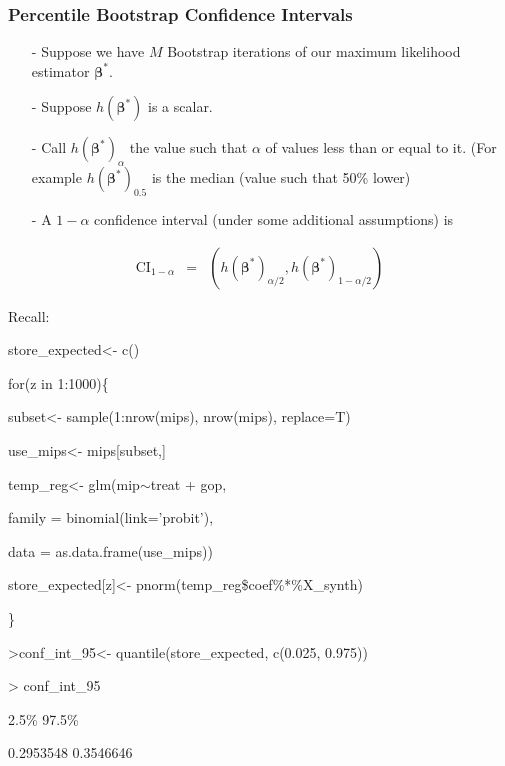 \documentclass{beamer}
\begin{document}
\begin{frame}
\frametitle{Percentile Bootstrap Confidence Intervals}

\begin{itemize}
\item[-] Suppose we have $M$ Bootstrap iterations of our maximum likelihood estimator $\boldsymbol{\beta}^{*}$. 
\item[-] Suppose $h(\boldsymbol{\beta}^{*})$ is a scalar.    
\item[-] Call $h(\boldsymbol{\beta}^{*})_{\alpha}$ the value such that $\alpha$ of values less than or equal to it.  (For example $h(\boldsymbol{\beta}^{*})_{0.5}$ is the \alert{median} (value such that 50\% lower)
\item[-] A $1 - \alpha$ confidence interval (under some additional assumptions) is 
\end{itemize}

\begin{eqnarray}
\text{CI}_{1-\alpha} & = & \left(h(\boldsymbol{\beta}^{*})_{\alpha/2}, h(\boldsymbol{\beta}^{*})_{1- \alpha/2}\right) \nonumber
\end{eqnarray}


\end{frame}


\begin{frame}
Recall:
\begin{semiverbatim}
store\_expected<- c()

for(z in 1:1000)\{

\hspace{0.2in}	subset<- sample(1:nrow(mips), nrow(mips), replace=T)

\hspace{0.2in}	use\_mips<- mips[subset,]

\hspace{0.2in}	temp\_reg<- glm(mip$\sim$treat + gop, 

\hspace{0.4in}		family = binomial(link='probit'), 

\hspace{0.4in}		data = as.data.frame(use\_mips))

\hspace{0.2in}	store\_expected[z]<- pnorm(temp\_reg\$coef\%*\%X\_synth)

	\}

>conf\_int\_95<- quantile(store\_expected, c(0.025, 0.975))

> conf\_int\_95

     2.5\%       97.5\%

0.2953548 0.3546646 

\end{semiverbatim}

\end{frame}
\end{document}
